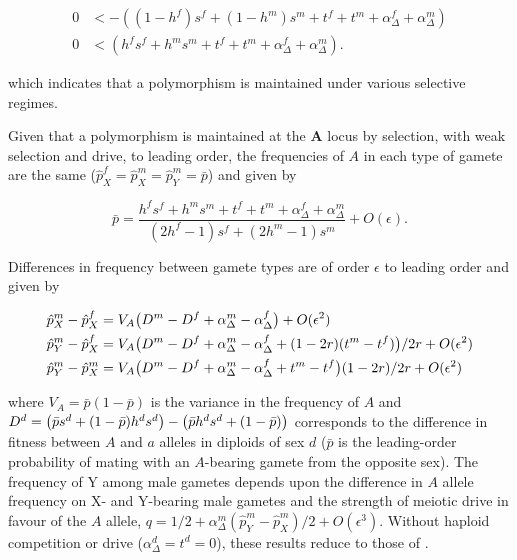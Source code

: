 \documentclass[12pt]{article}
\begin{document}
\begin{equation}
\begin{split}
0&<-((1-h^f)s^f +(1-h^m) s^m + t^f +t^m + \alpha_{\Delta}^f+\alpha_{\Delta}^m)\\
%
0&<(h^f s^f +h^m s^m + t^f +t^m + \alpha_{\Delta}^f+\alpha_{\Delta}^m).
\end{split}
\end{equation}

\noindent
which indicates that a polymorphism is maintained under various selective regimes. 

Given that a polymorphism is maintained at the \textbf{A} locus by selection, with weak selection and drive, to leading order, the frequencies of $A$ in each type of gamete are the same ($\hat{p}^f_X=\hat{p}^m_X=\hat{p}^m_Y=\bar{p}$) and given by 

\begin{equation}
\bar{p}=\frac{h^f s^f + h^m s^m +t^f+t^m+\alpha_{\Delta}^f+\alpha_{\Delta}^m}
{(2h^f-1)s^f+(2h^m-1)s^m}
+O(\epsilon)
.
\label{eq:pAve}
\end{equation}

\noindent
Differences in frequency between gamete types are of order $\epsilon$ to leading order and given by

\begin{equation}
\begin{split}
\hat{p}^m_X-\hat{p}^f_X&=V_{A}\big{(}D^m - D^f +\alpha_{\Delta}^m-\alpha_{\Delta}^f \big{)}
+O(\epsilon^2)\\
%
\hat{p}^m_Y-\hat{p}^f_X&=V_{A}\big{(}D^m - D^f+\alpha_{\Delta}^m-\alpha_{\Delta}^f+(1-2r)(t^m-t^f)\big{)}/2r
+O(\epsilon^2)\\
%
\hat{p}^m_Y-\hat{p}^m_X&=V_{A}\big{(}D^m - D^f+\alpha_{\Delta}^m-\alpha_{\Delta}^f+t^m-t^f\big{)}(1-2r)/2r
+O(\epsilon^2)
\end{split}
\label{eq:freq_diffs}
\end{equation}

\noindent
where $V_{A}=\bar{p}(1-\bar{p})$ is the variance in the frequency of $A$ and $D^d=\big{(} \bar{p}s^d+(1-\bar{p})h^d s^d\big{)} -\big{(} \bar{p}h^d s^d+(1-\bar{p}) \big{)}$ corresponds to the difference in fitness between $A$ and $a$ alleles in diploids of sex $d$ ($\bar{p}$ is the leading-order probability of mating with an $A$-bearing gamete from the opposite sex). 
The frequency of Y among male gametes depends upon the difference in $A$ allele frequency on X- and Y-bearing male gametes and the strength of meiotic drive in favour of the $A$ allele, $q=1/2+\alpha_{\Delta}^m(\hat{p}^m_Y-\hat{p}^m_X)/2+O(\epsilon^3)$.
Without haploid competition or drive ($\alpha_{\Delta}^d=t^d=0$), these results reduce to those of \citet{vanDoorn:2007eu}.
\end{document}
